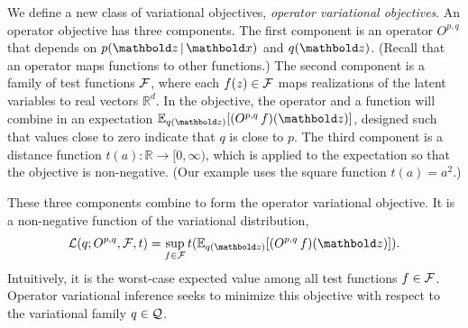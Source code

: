 We define a new class of variational objectives, \textit{operator
  variational objectives}.  An operator objective has three
components.  The first component is an operator $O^{p,q}$ that depends
on $p(\mbz\g \mbx)$ and $q(\mbz)$. (Recall that an operator maps functions to
other functions.)  The second component is a family of test functions
$\mathcal{F}$, where each $f(z) \in \mathcal{F}$ maps realizations of the latent
variables to real vectors $\mathbb{R}^d$.  In the objective, the
operator and a function will combine in an expectation
$\E_{q(\mbz)}[(O^{p,q}\, f )(\mbz)]$, designed such that values close to zero
indicate that $q$ is close to $p$.  The third component is a distance function
$t(a):\mathbb{R} \rightarrow [0, \infty)$, which is applied to the
expectation so that the objective is non-negative. (Our example
uses the square function $t(a)=a^2$.)

These three components combine to form the operator variational
objective.  It is a non-negative function of the variational
distribution,
\begin{align}
  \cL(q ; O^{p,q}, \cF, t) =
  \sup_{f \in \cF}
  t(\E_{q(\mbz)}[(O^{p,q} \, f)(\mbz)]).
  \label{eq:operator-obj}
\end{align}
Intuitively, it is the worst-case expected value among all
test functions $f\in\mathcal{F}$.  Operator variational inference seeks to minimize
this objective with respect to the variational family $q\in\mathcal{Q}$.


